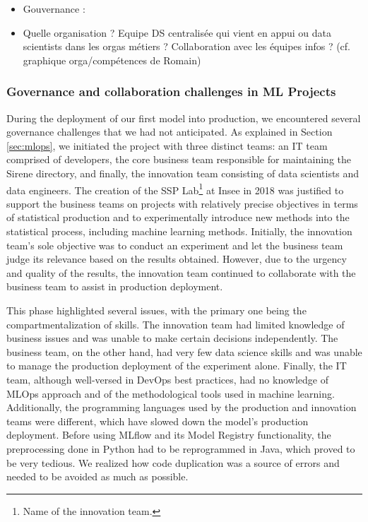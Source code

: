     \begin{itemize}
        \item Gouvernance :
        \item Quelle organisation ? Equipe DS centralisée qui vient en appui ou data scientists dans les orgas métiers ? Collaboration avec les équipes infos ? (cf. graphique orga/compétences de Romain)
    \end{itemize}


\subsubsection{Governance and collaboration challenges in ML Projects}

During the deployment of our first model into production, we encountered several governance challenges that we had not anticipated. As explained in Section \ref{sec:mlops}, we initiated the project with three distinct teams: an IT team comprised of developers, the core business team responsible for maintaining the Sirene directory, and finally, the innovation team consisting of data scientists and data engineers. The creation of the SSP Lab\footnote{Name of the innovation team.} at Insee in 2018 was justified to support the business teams on projects with relatively precise objectives in terms of statistical production and to experimentally introduce new methods into the statistical process, including machine learning methods. Initially, the innovation team's sole objective was to conduct an experiment and let the business team judge its relevance based on the results obtained. However, due to the urgency and quality of the results, the innovation team continued to collaborate with the business team to assist in production deployment.

This phase highlighted several issues, with the primary one being the compartmentalization of skills. The innovation team had limited knowledge of business issues and was unable to make certain decisions independently. The business team, on the other hand, had very few data science skills and was unable to manage the production deployment of the experiment alone. Finally, the IT team, although well-versed in DevOps best practices, had no knowledge of MLOps approach and of the methodological tools used in machine learning. Additionally, the programming languages used by the production and innovation teams were different, which have slowed down the model's production deployment. Before using MLflow and its Model Registry functionality, the preprocessing done in Python had to be reprogrammed in Java, which proved to be very tedious. We realized how code duplication was a source of errors and needed to be avoided as much as possible.

